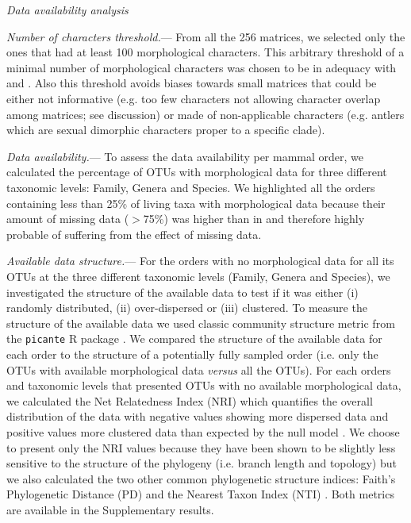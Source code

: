 \documentclass[12pt,letterpaper]{article}
\renewcommand{\subsection}[1]{%
\bigskip
\begin{center}
\begin{large}
\normalfont\itshape #1
\end{large}
\end{center}}
\renewcommand{\subsubsection}[1]{%
\vspace{2ex}
\noindent
\textit{#1.}---}
\begin{document}
\subsection{Data availability analysis}
\subsubsection{Number of characters threshold}
From all the 256 %
matrices, we selected only the ones that had at least 100 morphological characters. This arbitrary threshold of a minimal number of morphological characters was chosen to be in adequacy with \cite{GuillermeCooper} and \cite{harrisonamong-character2014}. Also this threshold avoids biases towards small matrices that could be either not informative (e.g. too few characters not allowing character overlap among matrices; see discussion) or made of non-applicable characters (e.g. antlers which are sexual dimorphic characters proper to a specific clade).

\subsubsection{Data availability}
To assess the data availability per mammal order, we calculated the percentage of OTUs with morphological data for three different taxonomic levels: Family, Genera and Species. We highlighted all the orders containing less than 25\% of living taxa with morphological data because their amount of missing data ($>$75\%) was higher than in \cite{GuillermeCooper} and therefore highly probable of suffering from the effect of missing data. 

\subsubsection{Available data structure}
For the orders with no morphological data for all its OTUs at the three different taxonomic levels (Family, Genera and Species), we investigated the structure of the available data to test if it was either (i) randomly distributed, (ii) over-dispersed or (iii) clustered. To measure the structure of the available data we used classic community structure metric from the \texttt{picante} R package \cite{picante}. We compared the structure of the available data for each order to the structure of a potentially fully sampled order (i.e. only the OTUs with available morphological data \textit{versus} all the OTUs).
For each orders and taxonomic levels that presented OTUs with no available morphological data, we calculated the Net Relatedness Index (NRI) which quantifies the overall distribution of the data with negative values showing more dispersed data and positive values more clustered data than expected by the null model \cite{webb2002phylogenies}. We choose to present only the NRI values because they have been shown to be slightly less sensitive to the structure of the phylogeny (i.e. branch length and topology) \cite{NRI,journal.pone.0004390} but we also calculated the two other common phylogenetic structure indices: Faith's Phylogenetic Distance (PD) \cite{Faith19921} and the Nearest Taxon Index (NTI) \cite{webb2002phylogenies}. Both metrics are available in the Supplementary results.
\end{document}
